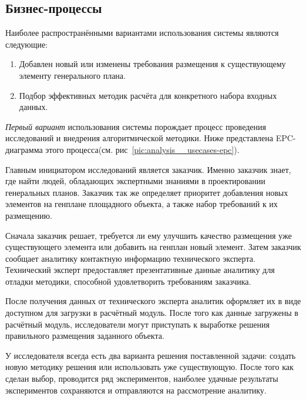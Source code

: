 \subsection{\Large{Бизнес-процессы}}

Наиболее распространёнными вариантами использования системы являются следующие:
\begin{enumerate}
	\item Добавлен новый или изменены требования размещения к существующему элементу генерального плана.
	\item Подбор эффективных методик расчёта для конкретного набора входных данных.
\end{enumerate}

\textit{Первый вариант} использования системы порождает процесс проведения исследований и
внедрения алгоритмической методики.
Ниже представлена EPC-диаграмма этого процесса(см. рис\ \ref{pic:analysis__usecases-epc}).

Главным инициатором исследований является заказчик. Именно заказчик знает, где найти людей,
обладающих экспертными знаниями в проектировании генеральных планов.
Заказчик так же определяет приоритет добавления
новых элементов на генплане площадного объекта, а также набор требований к их размещению.

Сначала заказчик решает, требуется ли ему улучшить качество размещения уже существующего элемента
или добавить на генплан новый элемент. Затем заказчик сообщает аналитику контактную
информацию технического эксперта. Технический эксперт предоставляет презентативные данные аналитику для отладки методики,
способной удовлетворить требованиям заказчика.

После получения данных от технического эксперта аналитик оформляет их в виде доступном для загрузки в расчётный модуль.
После того как данные загружены в расчётный модуль, исследователи могут приступать к выработке решения
правильного размещения заданного объекта.

У исследователя всегда есть два варианта решения поставленной задачи: создать новую методику решения
или использовать уже существующую.
После того как сделан выбор, проводится ряд экспериментов,
наиболее удачные результаты экспериментов сохраняются и отправляются на рассмотрение аналитику.

